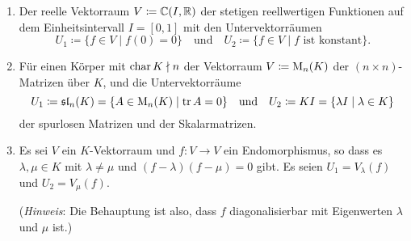 \begin{question}
\begin{enumerate}[leftmargin=*]
    \item
      Der reelle Vektorraum $V \coloneqq \mathbb{C}(I, \mathbb{R})$ der stetigen reellwertigen Funktionen auf dem Einheitsintervall $I = [0,1]$ mit den Untervektorräumen
      \[
        U_1 \coloneqq \{f \in V \mid f(0) = 0\}
        \quad\text{und}\quad
        U_2 \coloneqq \{f \in V \mid \text{$f$ ist konstant}\}.
      \]
%       
    \item
      Für einen Körper mit $\operatorname{char} K \nmid n$ der Vektorraum $V \coloneqq \operatorname{M}_n(K)$ der $(n \times n)$-Matrizen über $K$, und die Untervektorräume
      \[
        U_1 \coloneqq \mathfrak{sl}_n(K) = \{ A \in \operatorname{M}_n(K) \mid \operatorname{tr} A  = 0 \}
        \quad\text{und}\quad
        U_2 \coloneqq K I = \{ \lambda I \mid \lambda \in K \}
      \]
      der spurlosen Matrizen und der Skalarmatrizen.
    \item
      Es sei $V$ ein $K$-Vektorraum und $f \colon V \to V$ ein Endomorphismus, so dass es $\lambda, \mu \in K$ mit $\lambda \neq \mu$ und $(f-\lambda)(f-\mu) = 0$ gibt.
      Es seien $U_1 = V_\lambda(f)$ und $U_2 = V_\mu(f)$.
      
      (\emph{Hinweis}:
       Die Behauptung ist also, dass $f$ diagonalisierbar mit Eigenwerten $\lambda$ und $\mu$ ist.)
  \end{enumerate}
\end{question}


